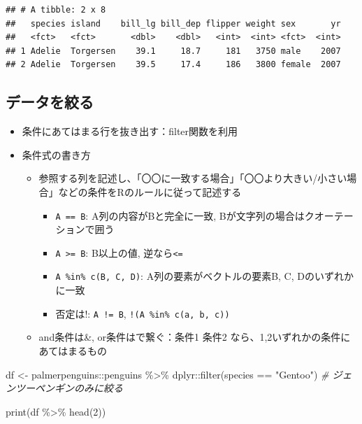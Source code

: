 \documentclass[
]{ltjsarticle}
\newenvironment{Shaded}{\begin{snugshade}}{\end{snugshade}}
\newcommand{\CommentTok}[1]{\textcolor[rgb]{0.56,0.35,0.01}{\textit{#1}}}
\newcommand{\DecValTok}[1]{\textcolor[rgb]{0.00,0.00,0.81}{#1}}
\newcommand{\FunctionTok}[1]{\textcolor[rgb]{0.00,0.00,0.00}{#1}}
\newcommand{\NormalTok}[1]{#1}
\newcommand{\OtherTok}[1]{\textcolor[rgb]{0.56,0.35,0.01}{#1}}
\newcommand{\SpecialCharTok}[1]{\textcolor[rgb]{0.00,0.00,0.00}{#1}}
\newcommand{\StringTok}[1]{\textcolor[rgb]{0.31,0.60,0.02}{#1}}
\providecommand{\tightlist}{%
  \setlength{\itemsep}{0pt}\setlength{\parskip}{0pt}}
\begin{document}
\begin{verbatim}
## # A tibble: 2 x 8
##   species island    bill_lg bill_dep flipper weight sex       yr
##   <fct>   <fct>       <dbl>    <dbl>   <int>  <int> <fct>  <int>
## 1 Adelie  Torgersen    39.1     18.7     181   3750 male    2007
## 2 Adelie  Torgersen    39.5     17.4     186   3800 female  2007
\end{verbatim}

\hypertarget{ux30c7ux30fcux30bfux3092ux7d5eux308b}{%
\subsection{データを絞る}\label{ux30c7ux30fcux30bfux3092ux7d5eux308b}}

\begin{itemize}
\tightlist
\item
  条件にあてはまる行を抜き出す：filter関数を利用
\item
  条件式の書き方

  \begin{itemize}
  \tightlist
  \item
    参照する列を記述し、「〇〇に一致する場合」「〇〇より大きい/小さい場合」などの条件をRのルールに従って記述する

    \begin{itemize}
    \tightlist
    \item
      \texttt{A\ ==\ B}: A列の内容がBと完全に一致,
      Bが文字列の場合はクオーテーションで囲う
    \item
      \texttt{A\ \textgreater{}=\ B}: B以上の値,
      逆なら\texttt{\textless{}=}
    \item
      \texttt{A\ \%in\%\ c(B,\ C,\ D)}: A列の要素がベクトルの要素B, C,
      Dのいずれかに一致
    \item
      否定は!: \texttt{A\ !=\ B}, \texttt{!(A\ \%in\%\ c(a,\ b,\ c))}
    \end{itemize}
  \item
    and条件は\&, or条件は\textbar で繋ぐ：条件1 \textbar{} 条件2
    なら、1,2いずれかの条件にあてはまるもの
  \end{itemize}
\end{itemize}

\begin{Shaded}
\begin{Highlighting}[]
\NormalTok{df }\OtherTok{\textless{}{-}}\NormalTok{ palmerpenguins}\SpecialCharTok{::}\NormalTok{penguins }\SpecialCharTok{\%\textgreater{}\%}
\NormalTok{  dplyr}\SpecialCharTok{::}\FunctionTok{filter}\NormalTok{(species }\SpecialCharTok{==} \StringTok{"Gentoo"}\NormalTok{) }\CommentTok{\# ジェンツーペンギンのみに絞る}

\FunctionTok{print}\NormalTok{(df }\SpecialCharTok{\%\textgreater{}\%} \FunctionTok{head}\NormalTok{(}\DecValTok{2}\NormalTok{))}
\end{Highlighting}
\end{Shaded}
\end{document}
